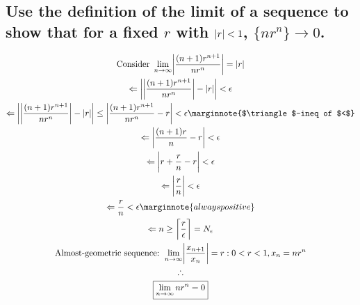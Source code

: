 \documentclass[letterpaper]{article}
\DeclarePairedDelimiter{\ceil}{\lceil}{\rceil}
\DeclarePairedDelimiter\abs{\lvert}{\rvert}
\begin{document}
\section{}
\subsection{Use the definition of the limit of a sequence to show that for a fixed $r$ with $\abs{r}<1$, $\{nr^n\}\rightarrow0$.}
\begin{gather*}
\text{Consider }\lim_{n\rightarrow\infty}\abs[\bigg]{\frac{(n+1)r^{n+1}}{nr^n}}=\abs{r} \\
\Leftarrow \abs[\bigg]{\abs[\bigg]{\frac{(n+1)r^{n+1}}{nr^n}}-\abs{r}}<\epsilon \\
\Leftarrow \abs[\bigg]{\abs[\bigg]{\frac{(n+1)r^{n+1}}{nr^n}}-\abs{r}}\leq\abs[\bigg]{\frac{(n+1)r^{n+1}}{nr^n}-r}<\epsilon \marginnote{$\triangle$-ineq of $<$} \\
\Leftarrow \abs[\bigg]{\frac{(n+1)r}{n}-r}<\epsilon \\
\Leftarrow \abs[\bigg]{r+\frac{r}{n}-r}<\epsilon \\
\Leftarrow \abs[\bigg]{\frac{r}{n}}<\epsilon \\
\Leftarrow \frac{r}{n}<\epsilon \marginnote{always positive} \\
\Leftarrow n\geq\ceil[\bigg]{\frac{r}{\epsilon}}=N_\epsilon \\
\text{Almost-geometric sequence: } \lim_{n\rightarrow\infty}\abs[\bigg]{\frac{x_{n+1}}{x_n}}=r:0<r<1,x_n=nr^n \\
\therefore \\
\boxed{\lim_{n\rightarrow\infty}nr^n=0}
\end{gather*}

\section{}
\end{document}
